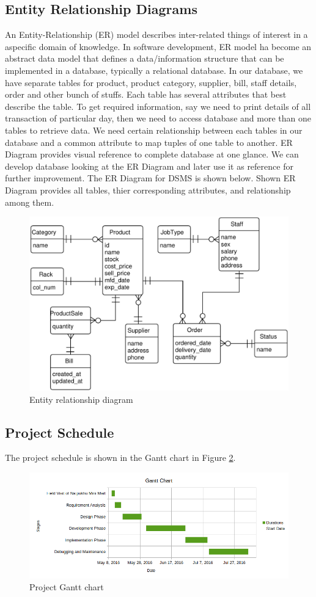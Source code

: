 \subsection{Entity Relationship Diagrams}

An Entity-Relationship (ER) model describes inter-related things of interest in
a aspecific domain of knowledge. In software development, ER model ha become an
abstract data model that defines a data/information structure that can be
implemented in a database, typically a relational database. In our database, we
have separate tables for product, product category, supplier, bill, staff
details, order and other bunch of stuffs. Each table has several attributes
that best describe the table. To get required information, say we need to print
details of all transaction of particular day, then we need to access database
and more than one tables to retrieve data. We need certain relationship between
each tables in our database and a common attribute to map tuples of one table
to another. ER Diagram provides visual reference to complete database at one
glance. We can develop database looking at the ER Diagram and later use it as
reference for further improvement. The ER Diagram for DSMS is shown below.
Shown ER Diagram provides all tables, thier corresponding attributes, and
relationship among them.


\begin{figure}[h]\centering
  \includegraphics[width=\textwidth]{fig/erd}
  \caption{Entity relationship diagram}\label{fig:erd}
\end{figure}


\subsection{Project Schedule}

The project schedule is shown in the Gantt chart in Figure \ref{fig:gantt}.

\begin{figure}[h]\centering
  \includegraphics[width=\textwidth]{fig/gantt}
  \caption{Project Gantt chart}\label{fig:gantt}
\end{figure}
